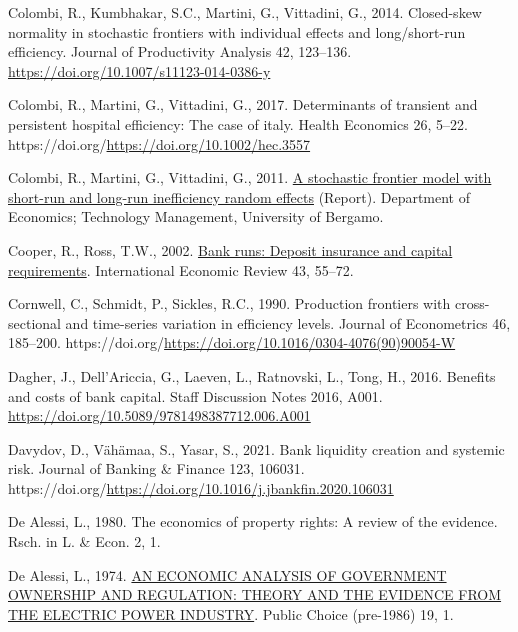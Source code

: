 \documentclass[
  12pt,
  a4paper,
  DIV=11,
  numbers=noendperiod]{scrreprt}
\newlength{\cslhangindent}
\newenvironment{CSLReferences}[2] %
 {\begin{list}{}{%
  \setlength{\itemindent}{0pt}
  \setlength{\leftmargin}{0pt}
  \setlength{\parsep}{0pt}
  \ifodd #1
   \setlength{\leftmargin}{\cslhangindent}
   \setlength{\itemindent}{-1\cslhangindent}
  \fi
  \setlength{\itemsep}{#2\baselineskip}}}
 {\end{list}}
\begin{document}
\begin{CSLReferences}{1}{0}
Colombi, R., Kumbhakar, S.C., Martini, G., Vittadini, G., 2014.
Closed-skew normality in stochastic frontiers with individual effects
and long/short-run efficiency. Journal of Productivity Analysis 42,
123--136. \url{https://doi.org/10.1007/s11123-014-0386-y}

Colombi, R., Martini, G., Vittadini, G., 2017. Determinants of transient
and persistent hospital efficiency: The case of italy. Health Economics
26, 5--22. https://doi.org/\url{https://doi.org/10.1002/hec.3557}

Colombi, R., Martini, G., Vittadini, G., 2011.
\href{https://EconPapers.repec.org/RePEc:brh:wpaper:1101}{A stochastic
frontier model with short-run and long-run inefficiency random effects}
(Report). Department of Economics; Technology Management, University of
Bergamo.

Cooper, R., Ross, T.W., 2002.
\href{http://www.jstor.org.queens.ezp1.qub.ac.uk/stable/827056}{Bank
runs: Deposit insurance and capital requirements}. International
Economic Review 43, 55--72.

Cornwell, C., Schmidt, P., Sickles, R.C., 1990. Production frontiers
with cross-sectional and time-series variation in efficiency levels.
Journal of Econometrics 46, 185--200.
https://doi.org/\url{https://doi.org/10.1016/0304-4076(90)90054-W}

Dagher, J., Dell'Ariccia, G., Laeven, L., Ratnovski, L., Tong, H., 2016.
Benefits and costs of bank capital. Staff Discussion Notes 2016, A001.
\url{https://doi.org/10.5089/9781498387712.006.A001}

Davydov, D., Vähämaa, S., Yasar, S., 2021. Bank liquidity creation and
systemic risk. Journal of Banking \& Finance 123, 106031.
https://doi.org/\url{https://doi.org/10.1016/j.jbankfin.2020.106031}

De Alessi, L., 1980. The economics of property rights: A review of the
evidence. Rsch. in L. \& Econ. 2, 1.

De Alessi, L., 1974.
\href{https://queens.ezp1.qub.ac.uk/login?url=https://www.proquest.com/scholarly-journals/economic-analysis-government-ownership-regulation/docview/236987376/se-2?accountid=13374\%0Ahttps://resolver.ebscohost.com/openurl?ctx_ver=Z39.88-2004&ctx_enc=info:ofi/enc:UTF-8&rfr_id=info:sid/ProQ\%3Aabiglobal&rft_val_fmt=info:ofi/fmt:kev:mtx:journal&rft.genre=unknown&rft.jtitle=Public+Choice+\%28pre-1986\%29&rft.atitle=AN+ECONOMIC+ANALYSIS+OF+GOVERNMENT+OWNERSHIP+AND+REGULATION\%3A+THEORY+AND+THE+EVIDENCE+FROM+THE+ELECTRIC+POWER+INDUSTRY&rft.au=De+Alessi\%2C+Louis&rft.aulast=De+Alessi&rft.aufirst=Louis&rft.date=1974-10-01&rft.volume=19&rft.issue=&rft.spage=1&rft.isbn=&rft.btitle=&rft.title=Public+Choice+\%28pre-1986\%29&rft.issn=00485829&rft_id=info:doi/}{AN
ECONOMIC ANALYSIS OF GOVERNMENT OWNERSHIP AND REGULATION: THEORY AND THE
EVIDENCE FROM THE ELECTRIC POWER INDUSTRY}. Public Choice (pre-1986) 19,
1.


\end{CSLReferences}
\end{document}
